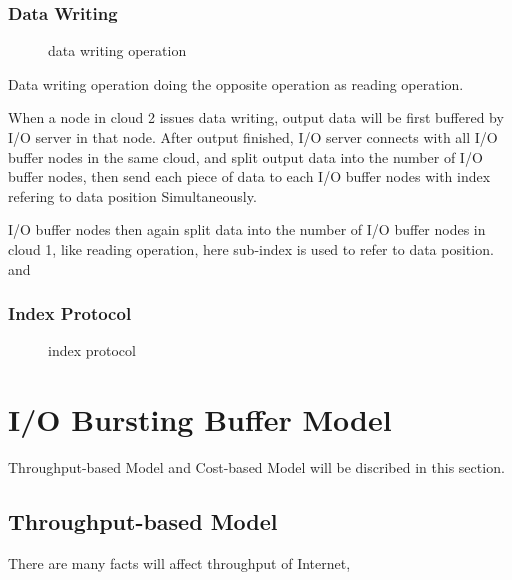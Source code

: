 \documentclass[JIP,draft]{ipsj}
\begin{document}
\subsubsection{Data Writing}

\begin{figure}[tb]
	\centering
	\caption{data writing operation}
	\label{writing}
\end{figure}

Data writing operation doing the opposite operation as reading operation.

When a node in cloud 2 issues data writing, output data will be first buffered by I/O server in that node.
After output finished, I/O server connects with all I/O buffer nodes in the same cloud, and split output data into the number of I/O buffer nodes, then send each piece of data to each I/O buffer nodes with index refering to data position Simultaneously.

I/O buffer nodes then again split data into the number of I/O buffer nodes in cloud 1, like reading operation, here sub-index is used to refer to data position. and 


\subsubsection{Index Protocol}

\begin{figure}[tb]
	\centering
	\caption{index protocol}
	\label{index protocol}
\end{figure}

\section{I/O Bursting Buffer Model}
Throughput-based Model and Cost-based Model will be discribed in this section.

\subsection{Throughput-based Model}
There are many facts will affect throughput of Internet, 
\end{document}
